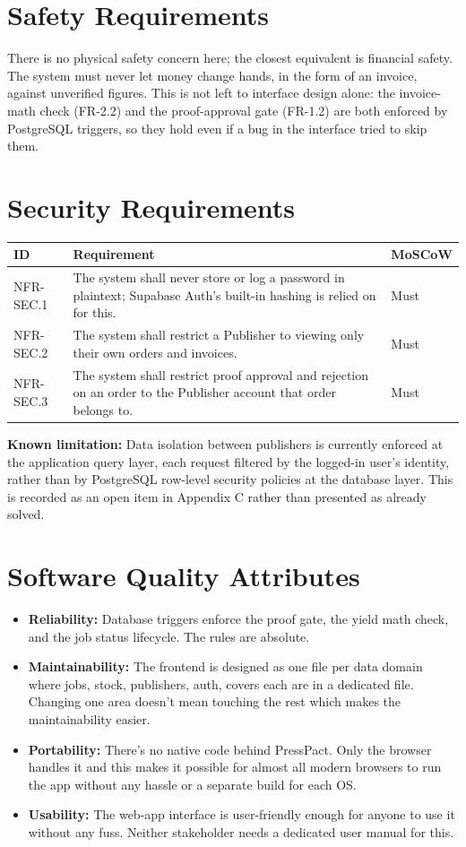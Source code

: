 \documentclass{scrreprt}
\begin{document}
\section{Safety Requirements}
There is no physical safety concern here; the closest equivalent is financial safety. The system must never let money change hands, in the form of an invoice, against unverified figures. This is not left to interface design alone: the invoice-math check (FR-2.2) and the proof-approval gate (FR-1.2) are both enforced by PostgreSQL triggers, so they hold even if a bug in the interface tried to skip them.

\section{Security Requirements}
\begin{longtable}{L{0.18\textwidth} L{0.68\textwidth} p{0.14\textwidth}}
\toprule
{} \textbf{ID} & \textbf{Requirement} & \textbf{MoSCoW} \\
\midrule
\endhead
NFR-SEC.1 & The system shall never store or log a password in plaintext; Supabase Auth's built-in hashing is relied on for this. & Must \\
NFR-SEC.2 & The system shall restrict a Publisher to viewing only their own orders and invoices. & Must \\
NFR-SEC.3 & The system shall restrict proof approval and rejection on an order to the Publisher account that order belongs to. & Must \\
\bottomrule
\end{longtable}

\textbf{Known limitation:} Data isolation between publishers is currently enforced at the application query layer, each request filtered by the logged-in user's identity, rather than by PostgreSQL row-level security policies at the database layer. This is recorded as an open item in Appendix C rather than presented as already solved.

\section{Software Quality Attributes}
\begin{itemize}
\item \textbf{Reliability:} Database triggers enforce the proof gate, the yield math check, and the
  job status lifecycle. The rules are absolute.
\item \textbf{Maintainability:} The frontend is designed as one file per data domain where jobs,
  stock, publishers, auth, covers each are in a dedicated file. Changing one
  area doesn't mean touching the rest which makes the maintainability easier.
\item \textbf{Portability:} There's no native code behind PressPact. Only the browser handles it and this makes it possible for almost all modern browsers to run the app without any hassle or a separate build for each OS.
\item \textbf{Usability:} The web-app interface is user-friendly enough for anyone to use it without any fuss. Neither stakeholder needs a dedicated user manual for this.
\end{itemize}
\end{document}
